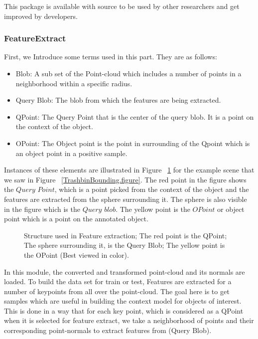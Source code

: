 This package is available with source to be used by other researchers and get improved by developers.\cite{AnnotationGithub}


\subsubsection{FeatureExtract}
\label{FeatureExtract.ssec}
First, we Introduce some terms used in this part. They are as follows:
\begin{itemize}
  \item Blob: A sub set of the Point-cloud which includes a number of points in a neighborhood within a specific radius.
  \item Query Blob: The blob from which the features are being extracted.
  \item QPoint: The Query Point that is the center of the query blob. It is a point on the context of the object.
  \item OPoint: The Object point is the point in surrounding of the Qpoint which is an object point in a positive sample.
 \end{itemize}
 
 Instances of these elements are illustrated in Figure ~\ref{FEStructure.figure} for the example scene that we saw in Figure 
 ~\ref{TrashbinBounding.figure}. 
 The red point in the figure shows the $Query$ $Point$, which is a point picked from the context of the object and the features are extracted from the sphere surrounding it. The sphere is also visible in the figure which is the 
$Query$ $blob$. 
 The yellow point is the $OPoint$ or object point which is a point on the annotated object. 
 
 \begin{figure}[t]
  \caption[Illustration of the items used in Feature Extract.]
  {Structure used in Feature extraction; The red point is the QPoint; The sphere surrounding it, is the Query Blob; The yellow
  point is the OPoint (Best viewed in color).}
  \label{FEStructure.figure}
\end{figure}
 
In this module, the converted and transformed point-cloud and its normals are loaded.
To build the data set for train or test, Features are extracted for a number of keypoints from all over 
the point-cloud. 
The goal here is to get samples which are useful in building the context model for objects of interest. 
This is done in a way that for each key point, which is considered as a QPoint when it is selected for feature extract, 
we take a neighborhood of points and their corresponding point-normals to extract features from (Query Blob). 

